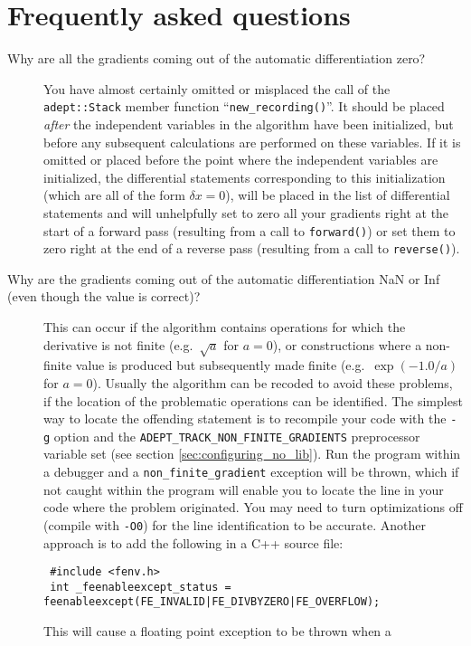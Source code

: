\documentclass[a4,oneside]{book}
\def\codesize{\small}
\def\code#1{{\codesize\texttt{#1}}}
\begin{document}
\section{Frequently asked questions}
\label{sec:faq}
\begin{description}
\item[Why are all the gradients coming out of the automatic
  differentiation zero?] You have almost certainly omitted or
  misplaced the call of the \code{adept::Stack} member function
  ``\code{new\_recording()}''. It should be placed \emph{after} the
  independent variables in the algorithm have been initialized, but
  before any subsequent calculations are performed on these
  variables. If it is omitted or placed before the point where the
  independent variables are initialized, the differential statements
  corresponding to this initialization (which are all of the form
  $\delta x=0$), will be placed in the list of differential statements
  and will unhelpfully set to zero all your gradients right at the
  start of a forward pass (resulting from a call to \code{forward()})
  or set them to zero right at the end of a reverse pass (resulting
  from a call to \code{reverse()}).
\item[Why are the gradients coming out of the automatic
  differentiation NaN or Inf (even though the value is correct)?] This
  can occur if the algorithm contains operations for which the
  derivative is not finite (e.g.\ $\sqrt{a}$ for $a=0$), or
  constructions where a non-finite value is produced but subsequently
  made finite (e.g.\ $\exp(-1.0/a)$ for $a=0$). Usually the algorithm
  can be recoded to avoid these problems, if the location of the
  problematic operations can be identified. The simplest way to locate
  the offending statement is to recompile your code with the \code{-g}
  option and the \code{ADEPT\_TRACK\_NON\_FINITE\_GRADIENTS}
  preprocessor variable set (see section
  \ref{sec:configuring_no_lib}). Run the program within a debugger and
  a \code{non\_finite\_gradient} exception will be thrown, which if
  not caught within the program will enable you to locate the line in
  your code where the problem originated.  You may need to turn
  optimizations off (compile with \code{-O0}) for the line
  identification to be accurate. Another approach is to add the
  following in a C++ source file:
\begin{lstlisting}
 #include <fenv.h>
 int _feenableexcept_status = feenableexcept(FE_INVALID|FE_DIVBYZERO|FE_OVERFLOW);
\end{lstlisting}
  This will cause a floating point exception to be thrown when a

\end{description}
\end{document}
